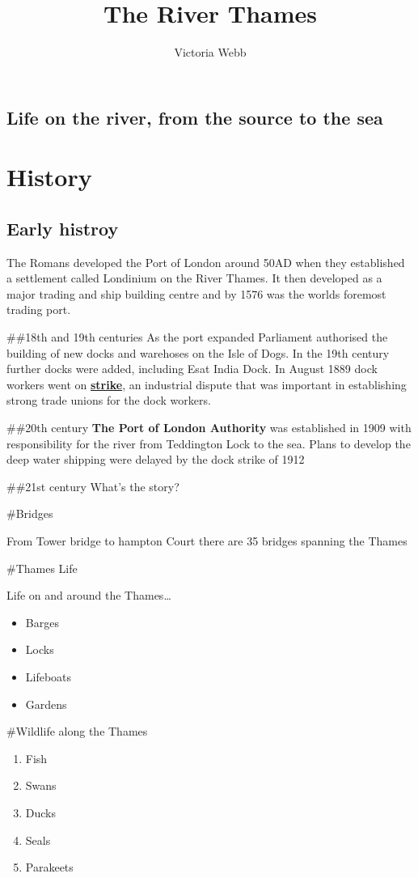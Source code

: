 \documentclass[
  openany]{book}
\title{The River Thames}
\author{Victoria Webb}
\date{}
\providecommand{\tightlist}{%
  \setlength{\itemsep}{0pt}\setlength{\parskip}{0pt}}
\begin{document}
\maketitle

{
\setcounter{tocdepth}{1}
\tableofcontents
}
\hypertarget{life-on-the-river-from-the-source-to-the-sea}{%
\section{Life on the river, from the source to the sea}\label{life-on-the-river-from-the-source-to-the-sea}}

\hypertarget{history}{%
\chapter{History}\label{history}}

\hypertarget{early-histroy}{%
\section{Early histroy}\label{early-histroy}}

The Romans developed the Port of London around 50AD when they established a settlement called Londinium on the River Thames.
It then developed as a major trading and ship building centre and by 1576 was the worlds foremost trading port.

\#\#18th and 19th centuries
As the port expanded Parliament authorised the building of new docks and warehoses on the Isle of Dogs.
In the 19th century further docks were added, including Esat India Dock.
In August 1889 dock workers went on \textbf{\href{https://en.wikipedia.org/wiki/London_dock_strike,_1889}{strike}}, an industrial dispute that was important in establishing strong trade unions for the dock workers.

\#\#20th century
\textbf{The Port of London Authority} was established in 1909 with responsibility for the river from Teddington Lock to the sea.
Plans to develop the deep water shipping were delayed by the dock strike of 1912

\#\#21st century
What's the story?

\#Bridges

From Tower bridge to hampton Court there are 35 bridges spanning the Thames

\#Thames Life

Life on and around the Thames\ldots{}

\begin{itemize}
\tightlist
\item
  Barges
\item
  Locks
\item
  Lifeboats
\item
  Gardens
\end{itemize}

\#Wildlife along the Thames

\begin{enumerate}
\def\labelenumi{\arabic{enumi}.}
\tightlist
\item
  Fish
\item
  Swans
\item
  Ducks
\item
  Seals
\item
  Parakeets
\end{enumerate}
\end{document}
